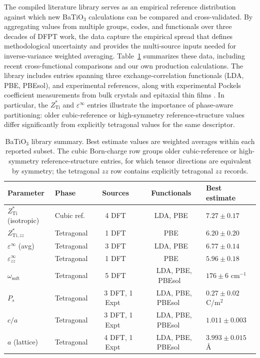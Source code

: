 \documentclass[twocolumn,superscriptaddress,amsmath,amssymb,longbibliography]{revtex4-2}
\begin{document}
The compiled literature library serves as an empirical reference distribution against which
new BaTiO$_3$ calculations can be compared and cross-validated.
By aggregating values from
multiple groups, codes, and functionals over three decades of DFPT work, the data
capture the empirical spread that defines methodological uncertainty and
provides the multi-source inputs needed for inverse-variance weighted
averaging. Table~\ref{tab:literature_library} summarizes  these data, including recent
cross-functional comparisons \cite{Amounas2024,Inerbaev2025} and our own
production calculations. The library includes entries
spanning three
exchange-correlation functionals (LDA, PBE, PBEsol),
and experimental
references, along with experimental Pockels coefficient measurements from
bulk crystals and epitaxial thin
films \cite{Reynaud2025,Suceava2025,Ghosez1998_BEC,Zhong1994_BTO,Veithen2005,Kwei1993,Hewat1973}. In particular, the  $Z^*_{\mathrm{Ti}}$ and $\varepsilon^\infty$ entries illustrate the
importance of phase-aware partitioning: older cubic-reference or high-symmetry
reference-structure values differ significantly from explicitly tetragonal
values for the same descriptor.

\begin{table}
\centering
\caption{BaTiO$_3$ library summary. Best estimate values are weighted averages within each reported subset. The cubic Born-charge row groups older cubic-reference or high-symmetry reference-structure entries, for which tensor directions are equivalent by symmetry; the tetragonal $zz$ row contains explicitly tetragonal $zz$ records.}
\label{tab:literature_library}
\begin{tabular}{llccl}
\toprule
Parameter & Phase & Sources & Functionals & Best estimate \\
\midrule
$Z^*_{\mathrm{Ti}}$ (isotropic) & Cubic ref. & 4 DFT & LDA, PBE & $7.27 \pm 0.17$ \\
$Z^*_{\mathrm{Ti},zz}$ & Tetragonal & 1 DFT & PBE & $6.20 \pm 0.20$ \\
$\varepsilon^\infty$ (avg) & Tetragonal & 3 DFT & LDA, PBE & $6.77 \pm 0.14$ \\
$\varepsilon^\infty_{zz}$ & Tetragonal & 1 DFT & PBE & $5.96 \pm 0.18$ \\
$\omega_{\mathrm{soft}}$ & Tetragonal & 5 DFT & ~ LDA, PBE, PBEsol~ & $176 \pm 6$ cm$^{-1}$ \\
$P_s$ & Tetragonal & ~ 3 DFT, 1 Expt ~ & ~ LDA, PBE, PBEsol ~& $0.27 \pm 0.02$ C/m$^2$ \\
$c/a$ & Tetragonal & ~ 3 DFT, 1 Expt ~ & ~ LDA, PBE, PBEsol ~& $1.011 \pm 0.003$ \\
$a$ (lattice) & Tetragonal & ~ 4 DFT, 1 Expt ~ & ~ LDA, PBE, PBEsol ~ & $3.993 \pm 0.015$ \AA \\
\bottomrule
\end{tabular}
\end{table}
\end{document}
